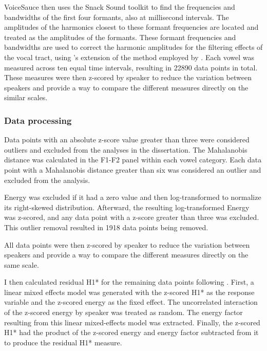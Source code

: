 VoiceSauce then uses the Snack Sound toolkit \citep{sjolanderSnackSoundToolkit2004} to find the frequencies and bandwidths of the first four formants, also at millisecond intervals. The amplitudes of the harmonics closest to these formant frequencies are located and treated as the amplitudes of the formants. These formant frequencies and bandwidths are used to correct the harmonic amplitudes for the filtering effects of the vocal tract, using \citeauthor{iseliAgeSexVowel2007}'s \citeyear{iseliAgeSexVowel2007} extension of the method employed by \citet{hansonGlottalCharacteristicsFemale1997}. Each vowel was measured across ten equal time intervals, resulting in 22890 data points in total. These measures were then z-scored by speaker to reduce the variation between speakers and provide a way to compare the different measures directly on the similar scales.

\subsubsection{Data processing} \label{sec:data_processing}
Data points with an absolute z-score value greater than three were considered outliers and excluded from the analyses in the dissertation. The Mahalanobis distance was calculated in the F1-F2 panel within each vowel category. Each data point with a Mahalanobis distance greater than six was considered an outlier and excluded from the analysis.  

Energy was excluded if it had a zero value and then log-transformed to normalize its right-skewed distribution. Afterward, the resulting log-transformed Energy was z-scored, and any data point with a z-score greater than three was excluded. This outlier removal resulted in 1918 data points being removed. 

All data points were then z-scored by speaker to reduce the variation between speakers and provide a way to compare the different measures directly on the same scale.

I then calculated residual H1* for the remaining data points following \citet{chaiH1H2AcousticMeasure2022}. First, a linear mixed effects model was generated with the z-scored H1* as the response variable and the z-scored energy as the fixed effect. The uncorrelated interaction of the z-scored energy by speaker was treated as random. The energy factor resulting from this linear mixed-effects model was extracted. Finally, the z-scored H1* had the product of the z-scored energy and energy factor subtracted from it to produce the residual H1* measure. 

